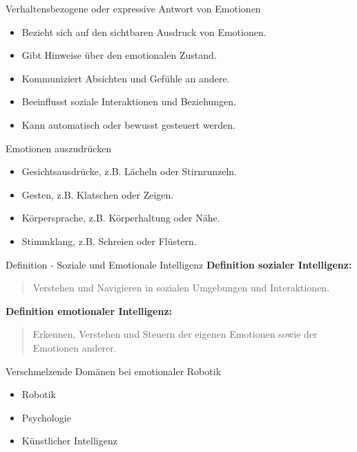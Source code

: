 \documentclass[aspectratio=169]{beamer}
\begin{document}
\begin{frame}{Verhaltensbezogene oder expressive Antwort von Emotionen}
  \begin{itemize}
      \item Bezieht sich auf den sichtbaren Ausdruck von Emotionen.
      \item Gibt Hinweise über den emotionalen Zustand.
      \item Kommuniziert Absichten und Gefühle an andere.
      \item Beeinflusst soziale Interaktionen und Beziehungen.
      \item Kann automatisch oder bewusst gesteuert werden.
  \end{itemize}
\end{frame}

\begin{frame}{Emotionen auszudrücken}
  \begin{itemize}
      \item Gesichtsausdrücke, z.B. Lächeln oder Stirnrunzeln.
      \item Gesten, z.B. Klatschen oder Zeigen.
      \item Körpersprache, z.B. Körperhaltung oder Nähe.
      \item Stimmklang, z.B. Schreien oder Flüstern.
  \end{itemize}
\end{frame}

\begin{frame}{Definition - Soziale und Emotionale Intelligenz}
  \textbf{Definition sozialer Intelligenz:}
  \begin{quote}
      Verstehen und Navigieren in sozialen Umgebungen und Interaktionen.
  \end{quote}
  
  \textbf{Definition emotionaler Intelligenz:}
  \begin{quote}
      Erkennen, Verstehen und Steuern der eigenen Emotionen sowie der Emotionen anderer.
  \end{quote}
\end{frame}

\begin{frame}{Verschmelzende Domänen bei emotionaler Robotik}
  \begin{itemize}
      \item Robotik
      \item Psychologie
      \item Künstlicher Intelligenz
  \end{itemize}
\end{frame}
\end{document}
